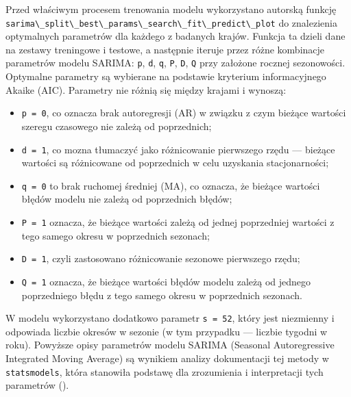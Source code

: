 \documentclass[polish, twoside, 12pt, a4paper]{article}
\theoremstyle{definition}
\theoremstyle{plain}
\theoremstyle{remark}
\newcommand{\code}[1]{\lstinline{#1}}
\begin{document}

Przed właściwym procesem trenowania modelu wykorzystano autorską funkcję \code{sarima\_split\_best\_params\_search\_fit\_predict\_plot} do znalezienia optymalnych parametrów dla każdego z badanych krajów. Funkcja ta dzieli dane na zestawy treningowe i testowe, a następnie iteruje przez różne kombinacje parametrów modelu SARIMA: \code{p}, \code{d}, \code{q}, \code{P}, \code{D}, \code{Q} przy założone rocznej sezonowości. Optymalne parametry są wybierane na podstawie kryterium informacyjnego Akaike (AIC). Parametry nie różnią się między krajami i wynoszą:
\begin{itemize}[noitemsep]
	\item \code{p = 0}, co oznacza brak autoregresji (AR) w związku z czym bieżące wartości szeregu czasowego nie zależą od poprzednich;
	\item \code{d = 1}, co mozna tłumaczyć jako różnicowanie pierwszego rzędu --- bieżące wartości są różnicowane od poprzednich w celu uzyskania stacjonarności;
	\item \code{q = 0} to brak ruchomej średniej (MA), co oznacza, że bieżące wartości błędów modelu nie zależą od poprzednich błędów;
	\item \code{P = 1} oznacza, że bieżące wartości zależą od jednej poprzedniej wartości z tego samego okresu w poprzednich sezonach;
	\item \code{D = 1}, czyli zastosowano różnicowanie sezonowe pierwszego rzędu;
	\item \code{Q = 1} oznacza, że bieżące wartości błędów modelu zależą od jednego poprzedniego błędu z tego samego okresu w poprzednich sezonach.
\end{itemize}


W modelu wykorzystano dodatkowo parametr \code{s = 52}, który jest niezmienny i odpowiada liczbie okresów w sezonie (w tym przypadku --- liczbie tygodni w roku). Powyższe opisy parametrów modelu SARIMA (Seasonal Autoregressive Integrated Moving Average) są wynikiem analizy dokumentacji tej metody w \code{statsmodels}, która stanowiła podstawę dla zrozumienia i interpretacji tych parametrów (\cite{sarimax-doc}).
\end{document}
